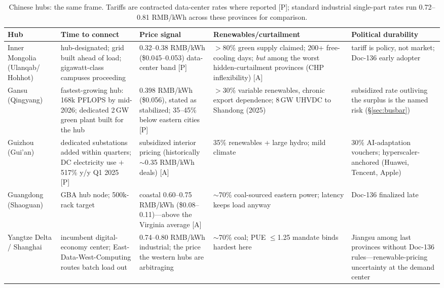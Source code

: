 \begin{table}[htbp]
  \centering
  \scriptsize
  \caption{Chinese hubs: the same frame. Tariffs are contracted data-center rates where reported [P]; standard industrial single-part rates run 0.72--0.81 RMB/kWh across these provinces for comparison.}
  \label{tab:busbar-cn}
  \setlength{\tabcolsep}{3pt}
  \begin{tabular}{p{20mm}p{30mm}p{28mm}p{32mm}p{28mm}}
    \toprule
    Hub & Time to connect & Price signal & Renewables/curtailment & Political durability \\
    \midrule
    Inner Mongolia (Ulanqab/ Hohhot) & hub-designated; grid built ahead of load; gigawatt-class campuses proceeding & 0.32--0.38 RMB/kWh (\$0.045--0.053) data-center band [P]~\cite{hub-tariffs} & $>$80\% green supply claimed; 200+ free-cooling days; \emph{but} among the worst hidden-curtailment provinces (CHP inflexibility) [A]~\cite{doc136} & tariff is policy, not market; Doc-136 early adopter \\
    \addlinespace
    Gansu (Qingyang) & fastest-growing hub: 168k PFLOPS by mid-2026; dedicated 2\,GW green plant built for the hub & 0.398 RMB/kWh (\$0.056), stated as stabilized; 35--45\% below eastern cities [P]~\cite{hub-tariffs} & $>$30\% variable renewables, chronic export dependence; 8\,GW UHVDC to Shandong (2025) & subsidized rate outliving the surplus is the named risk (\S\ref{sec:busbar}) \\
    \addlinespace
    Guizhou (Gui'an) & dedicated substations added within quarters; DC electricity use $+$517\% y/y Q1 2025 [P]~\cite{hub-tariffs} & subsidized interior pricing (historically $\sim$0.35 RMB/kWh deals) [A]~\cite{oies-china-dc} & 35\% renewables + large hydro; mild climate & 30\% AI-adaptation vouchers; hyperscaler-anchored (Huawei, Tencent, Apple) \\
    \addlinespace
    Guangdong (Shaoguan) & GBA hub node; 500k-rack target & coastal 0.60--0.75 RMB/kWh (\$0.08--0.11)---above the Virginia average [A]~\cite{oies-china-dc} & $\sim$70\% coal-sourced eastern power; latency keeps load anyway & Doc-136 finalized late \\
    \addlinespace
    Yangtze Delta / Shanghai & incumbent digital-economy center; East-Data-West-Computing routes batch load out & 0.74--0.80 RMB/kWh industrial; the price the western hubs are arbitraging & $\sim$70\% coal; PUE $\le$1.25 mandate binds hardest here & Jiangsu among last provinces without Doc-136 rules---renewable-pricing uncertainty at the demand center \\
    \bottomrule
  \end{tabular}
\end{table}

